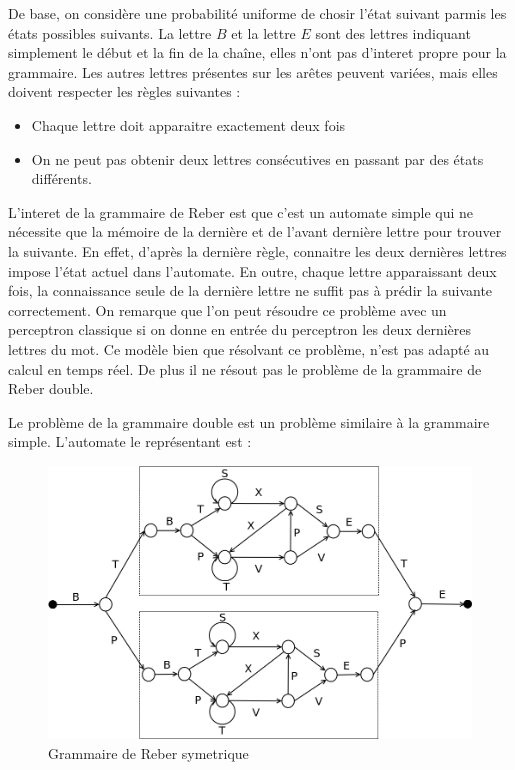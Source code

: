De base, on considère une probabilité uniforme de chosir l'état suivant parmis
les états possibles suivants. La lettre $B$ et la lettre $E$ sont des lettres
indiquant simplement le début et la fin de la chaîne, elles n'ont pas d'interet
propre pour la grammaire. Les autres lettres présentes sur les arêtes peuvent
variées, mais elles doivent respecter les règles suivantes :
\medskip
\begin{itemize}
	\item Chaque lettre doit apparaitre exactement deux fois
	\item On ne peut pas obtenir deux lettres consécutives en passant par des états différents.
\end{itemize}

\vspace{\parskip}
L'interet de la grammaire de Reber est que c'est un automate simple qui ne nécessite que la mémoire de la dernière et de l'avant dernière lettre pour trouver la suivante. En effet, d'après la dernière règle, connaitre les deux dernières lettres impose l'état actuel dans l'automate. En outre, chaque lettre apparaissant deux fois, la connaissance seule de la dernière lettre ne suffit pas à prédir la suivante correctement. On remarque que l'on peut résoudre ce problème avec un perceptron classique si on donne en entrée du perceptron les deux dernières lettres du mot. Ce modèle bien que résolvant ce problème, n'est pas adapté au calcul en temps réel. De plus il ne résout pas le problème de la grammaire de Reber double.

Le problème de la grammaire double est un problème similaire à la grammaire simple. L'automate le représentant est :

\begin{figure}[!ht]
\begin{center}
\includegraphics[scale=0.4]{rtrl/reberGrammarSymmetric.png}
\end{center}
\caption{Grammaire de Reber symetrique}
\end{figure}

